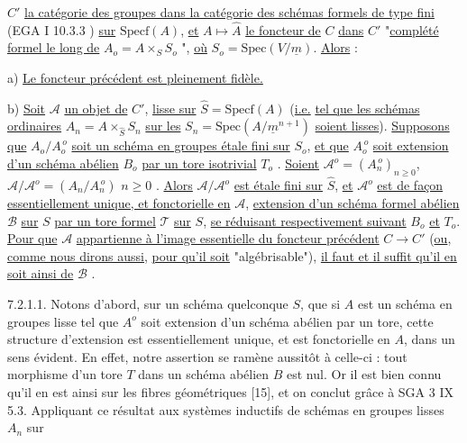 
$C'$ \underline{la catégorie des groupes dans la catégorie des schémas formels de type fini} (EGA I 10.3.3 ) \underline{sur} $\mathrm{Specf}(A)$, \underline{et} $A \longmapsto \hat{A}$ \underline{le foncteur de} $C$ \underline{dans} $C'$ "\underline{complété formel le long de} $A_o = A \times_S S_o$ ", \underline{où} $S_o = \mathrm{Spec}(V/\underline{m})$. \underline{Alors} :

a) \underline{Le foncteur précédent est pleinement fidèle.}

b) \underline{Soit} $\mathcal{A}$ \underline{un objet de} $C'$, \underline{lisse sur} $\hat{S} = \mathrm{Specf}(A)$ (\underline{i.e.} \underline{tel que les schémas ordinaires} $A_n = A \times_{\hat{S}} S_n$ \underline{sur les} $S_n = \mathrm{Spec}(A/\underline{m}^{n+1})$ \underline{soient lisses}). \underline{Supposons que} $A_o/A_o^{\,o}$ \underline{soit un schéma en groupes étale fini sur} $S_o$, \underline{et que} $A_o^{\,o}$ \underline{soit extension d'un schéma abélien} $B_o$ \underline{par un tore isotrivial} $T_o$ . \underline{Soient} $\mathcal{A}^o = (A_n^{\,o})_{n \geq 0}$, $\mathcal{A}/\mathcal{A}^o = (A_n/A_n^{\,o})$ $n \geq 0$ . \underline{Alors} $\mathcal{A}/\mathcal{A}^o$ \underline{est étale fini sur} $\hat{S}$, \underline{et} $\mathcal{A}^o$ \underline{est de façon essentiellement unique, et fonctorielle en} $\mathcal{A}$, \underline{extension d'un schéma formel abélien} $\mathcal{B}$ \underline{sur} $S$ \underline{par un tore formel} $\mathcal{T}$ \underline{sur} $S$, \underline{se réduisant respectivement suivant} $B_o$ \underline{et} $T_o$. \underline{Pour que} $\mathcal{A}$ \underline{appartienne à l'image essentielle du foncteur précédent} $C \longrightarrow C'$ (\underline{ou}, \underline{comme nous dirons aussi}, \underline{pour qu'il soit} "algébrisable"), \underline{il faut et il suffit qu'il en soit ainsi de} $\mathcal{B}$ .

7.2.1.1. Notons d'abord, sur un schéma quelconque $S$, que si $A$ est un schéma en groupes lisse tel que $A^o$ soit extension d'un schéma abélien par un tore, cette structure d'extension est essentiellement unique, et est fonctorielle en $A$, dans un sens évident. En effet, notre assertion se ramène aussitôt à celle-ci : tout morphisme d'un tore $T$ dans un schéma abélien $B$ est nul. Or il est bien connu qu'il en est ainsi sur les fibres géométriques [15], et on conclut grâce à SGA 3 IX 5.3. Appliquant ce résultat aux systèmes inductifs de schémas en groupes lisses $A_n$ sur



